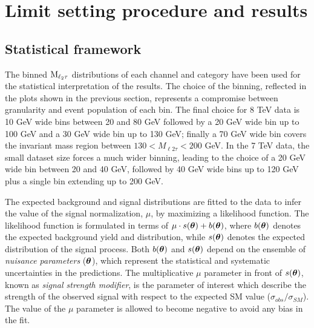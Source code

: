 \begin{table}
\caption{%
Expected event yields for the different background processes and for a 125 GeV WH, $\rm{H}\To\tau\tau$ signal compared to the number of events observed in the data, split by channel and category, for 7 TeV data. The uncertainty quoted in each background process represents statistical plus systematic uncertainty.}

\label{tab:prefit_yields_table_7TeV}
\end{table}


\section{Limit setting procedure and results}

\subsection{Statistical framework}
The binned $\rm{M}_{\ell_2 \tau}$ distributions of each channel and category have been used for the statistical interpretation of the results. The choice of the binning, reflected in the plots shown in the previous section, represents a compromise between granularity and event population of each bin. The final choice for 8 TeV data is 10 GeV wide bins between 20 and 80 GeV followed by a 20 GeV wide bin up to 100 GeV and a 30 GeV wide bin up to 130 GeV; finally a 70 GeV wide bin covers the invariant mass region between $130 < M_{\ell 2 \tau} < 200$ GeV. In the 7 TeV data, the small dataset size forces a much wider binning, leading to the choice of a 20 GeV wide bin between 20 and 40 GeV, followed by 40 GeV wide bins up to 120 GeV plus a single bin extending up to 200 GeV.

The expected background and signal distributions are fitted to the data to infer the value of the signal normalization, $\mu$, by maximizing a likelihood function.
The likelihood function is formulated in terms of $\mu \cdot s(\boldtheta) + b(\boldtheta)$, where $b(\boldtheta)$ denotes the expected background yield and distribution, while $s(\boldtheta)$ denotes the expected distribution of the signal process. Both $b(\boldtheta)$ and $s(\boldtheta)$ depend on the ensemble of \emph{nuisance parameters} ($\boldtheta$), which represent the statistical and systematic uncertainties in the predictions. The multiplicative $\mu$ parameter in front of $s(\boldtheta)$, known as \emph{signal strength modifier}, is the parameter of interest which describe the strength of the observed signal with respect to the expected SM value ($\sigma_{obs}/\sigma_{SM}$). The value of the $\mu$ parameter is allowed to become negative to avoid any bias in the fit.

